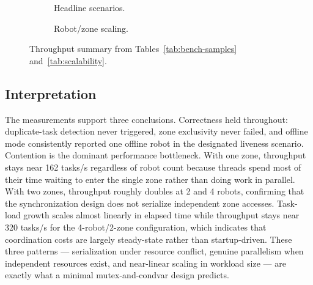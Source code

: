 \documentclass[11pt]{article}
\begin{document}
\begin{figure}[H]
\centering
\begin{subfigure}[t]{0.49\linewidth}
\centering
{}
\caption{Headline scenarios.}
\end{subfigure}
\hfill
\begin{subfigure}[t]{0.49\linewidth}
\centering
{}
\caption{Robot/zone scaling.}
\end{subfigure}
\caption{Throughput summary from Tables~\ref{tab:bench-samples} and~\ref{tab:scalability}.}
\label{fig:bench-charts}
\end{figure}

\subsection{Interpretation}
The measurements support three conclusions. Correctness held throughout: duplicate-task detection never triggered, zone exclusivity never failed, and offline mode consistently reported one offline robot in the designated liveness scenario. Contention is the dominant performance bottleneck. With one zone, throughput stays near 162 tasks/s regardless of robot count because threads spend most of their time waiting to enter the single zone rather than doing work in parallel. With two zones, throughput roughly doubles at 2 and 4 robots, confirming that the synchronization design does not serialize independent zone accesses. Task-load growth scales almost linearly in elapsed time while throughput stays near 320 tasks/s for the 4-robot/2-zone configuration, which indicates that coordination costs are largely steady-state rather than startup-driven. These three patterns --- serialization under resource conflict, genuine parallelism when independent resources exist, and near-linear scaling in workload size --- are exactly what a minimal mutex-and-condvar design predicts.
\end{document}
